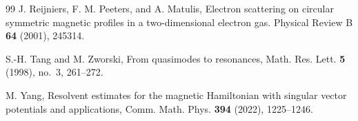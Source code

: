 \documentclass[11pt]{amsart}
\theoremstyle{remark}
\numberwithin{equation}{section}
\begin{document}
\begin{thebibliography}{99}
 J. Reijniers, F. M. Peeters, and A. Matulis, Electron scattering on circular symmetric magnetic profiles in a two-dimensional electron gas. Physical Review B {\bf 64} (2001), 245314.

 S.-H. Tang and M. Zworski, From quasimodes to resonances, Math. Res. Lett. {\bf 5} (1998), no.~3, 261--272.

 M. Yang, Resolvent estimates for the magnetic Hamiltonian with singular vector potentials and applications, Comm. Math. Phys. {\bf 394} (2022), 1225--1246.






\end{thebibliography}
\end{document}

